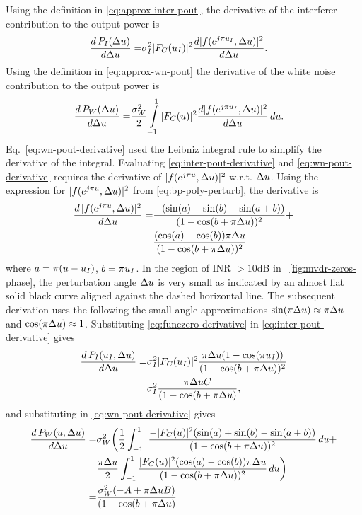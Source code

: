 Using the definition in \eqref{eq:approx-inter-pout}, the derivative of the interferer contribution to the output power is 
\begin{align} 
 \label{eq:inter-pout-derivative}
 \frac{d\,P_I(\Delta u)}{d\Delta u} =& \sigma_I^2|F_C(u_I)|^2 \frac{d |f(e^{j\pi u_I}, \Delta u)|^2}{d\Delta u}.
\end{align}
Using the definition in \eqref{eq:approx-wn-pout} the derivative of the white noise contribution to the output power is
\begin{align}
\label{eq:wn-pout-derivative}
\frac{d\,P_W(\Delta u)}{d\Delta u} =& \frac{\sigma^2_W}{2}\int\limits_{-1}^{1} |F_C(u)|^2 \frac{d|f(e^{j\pi u_I}, \Delta u) |^2}{d\Delta u}\,du.
\end{align}
Eq.~\eqref{eq:wn-pout-derivative} used the Leibniz integral rule to simplify the derivative of the integral. 
Evaluating \eqref{eq:inter-pout-derivative} and \eqref{eq:wn-pout-derivative} requires the derivative of $|f(e^{j\pi u}, \Delta u)|^2$ w.r.t.  $\Delta u$. Using the expression for $|f(e^{j\pi u}, \Delta u)|^2$ from \eqref{eq:bp-poly-perturb}, the derivative is
\begin{align} 
\label{eq:funczero-derivative}
\frac{d\, |f(e^{j\pi u}, \Delta u)|^2}{d\Delta u} =& \frac{-(\sin(a) + \sin(b) - \sin(a+b))}{(1 - \cos(b + \pi\Delta u))^2} + \nonumber \\
& \frac{(\cos(a) - \cos(b))\pi\Delta u}{(1 - \cos(b + \pi\Delta u))^2} 
\end{align}
where $a = \pi(u - u_I)$, $b = \pi u_I$. In the region of INR
$>10$dB in \figurename{}~\ref{fig:mvdr-zeros-phase}, the perturbation
angle $\Delta u$ is very small as indicated by an almost flat solid
black curve aligned against the dashed horizontal line. The subsequent
derivation uses the following the small angle approximations
$\sin(\pi\Delta u) \approx \pi\Delta u$ and
$\cos(\pi\Delta u) \approx 1$. Substituting
\eqref{eq:funczero-derivative} in \eqref{eq:inter-pout-derivative}
gives
\begin{align} 
\label{eq:nd-derivative}
\frac{d\,P_I(u_I, \Delta u)}{d\Delta u} =& \sigma_I^2 |F_C(u_I)|^2 \frac{\pi\Delta u(1 - \cos(\pi u_I))}{(1 - \cos(b + \pi\Delta u))^2} \nonumber \\
=& \sigma_I^2\frac{\pi\Delta u C}{(1 - \cos(b + \pi\Delta u)},
\end{align}
and substituting in \eqref{eq:wn-pout-derivative} gives
\begin{align} 
\label{eq:wng-derivative}
\frac{d\,P_W(u, \Delta u) }{d\Delta u} =& \sigma^2_W \biggl(\frac{1}{2}\int_{-1}^{1} \
\frac{-|F_C(u)|^2(\sin(a) + \sin(b) - \sin(a+b))}{(1 - \cos(b + \pi\Delta u))^2}\, du + \nonumber\\
& \frac{\pi\Delta u}{2}\int_{-1}^{1} \frac{|F_C(u)|^2(\cos(a)-\cos(b))\pi\Delta u}{(1 - \cos(b + \pi\Delta u))^2} \, du \biggr)  \nonumber \\
=& \frac{\sigma^2_W(-A + \pi\Delta u B)}{(1 - \cos(b + \pi\Delta u)}
\end{align}
